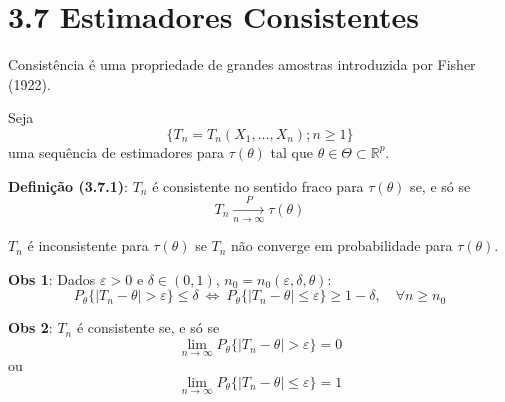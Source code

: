 \section*{3.7 Estimadores Consistentes}

Consistência é uma propriedade de grandes amostras introduzida por Fisher (1922).

Seja 
\[
\{T_n = T_n(X_1, \ldots, X_n); n \geq 1\}
\]
uma sequência de estimadores para $\tau(\theta)$ tal que $\theta \in \Theta \subset \mathbb{R}^p$.

\textbf{Definição (3.7.1)}: $T_n$ é consistente no sentido fraco para $\tau(\theta)$ se, e só se
\begin{equation}
T_n \xrightarrow[n \to \infty]{P} \tau(\theta)
\end{equation}

$T_n$ é inconsistente para $\tau(\theta)$ se $T_n$ não converge em probabilidade para $\tau(\theta)$.

\textbf{Obs 1}: Dados $\varepsilon > 0$ e $\delta \in (0,1)$, $n_0 = n_0(\varepsilon, \delta, \theta)$:
\begin{equation}
P_\theta\{|T_n - \theta| > \varepsilon\} \leq \delta \ \Longleftrightarrow \ P_\theta\{|T_n - \theta| \leq \varepsilon\} \geq 1 - \delta, \quad \forall n \geq n_0
\end{equation}

\textbf{Obs 2}: $T_n$ é consistente se, e só se
\begin{equation}
\lim_{n \to \infty} P_\theta\{|T_n - \theta| > \varepsilon\} = 0
\end{equation}
ou
\begin{equation}
\lim_{n \to \infty} P_\theta\{|T_n - \theta| \leq \varepsilon\} = 1
\end{equation}